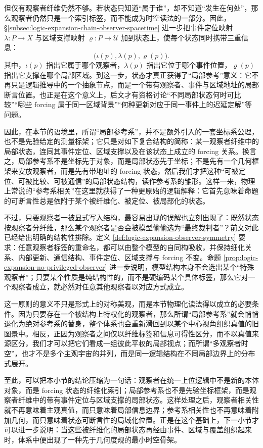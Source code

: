 但仅有观察者纤维仍然不够。若状态只知道“属于谁”，却不知道“发生在何处”，那么观察者仍然只是一个索引标签，而不能成为时空读法的一部分。因此，\S\ref{subsec:logic-expansion-chain-observer-spacetime} 进一步把事件定位映射 \(\lambda:P\to X\) 与区域支撑映射 \(\varrho:P\to\mathcal U\) 加到状态上，使每个状态同时携带三重信息：
\[
\bigl(\iota(p),\lambda(p),\varrho(p)\bigr).
\]
其中，\(\iota(p)\) 指出它属于哪个观察者，\(\lambda(p)\) 指出它位于哪个事件位置，\(\varrho(p)\) 指出它支撑在哪个局部区域。到这一步，状态才真正获得了“局部参考”意义：它不再只是逻辑推导中的一个抽象节点，而是一个带有观察者、事件与区域地址的局部断言位置。也正是在这个意义上，后文才有资格讨论“不同局部状态何时可比较”“哪些 forcing 属于同一区域背景”“何种更新对应于同一事件上的迟延定解”等问题。

因此，在本节的语境里，所谓“局部参考系”，并不是额外引入的一套坐标系公理，也不是先验给定的测量标架；它只是对如下复合结构的简称：某一观察者纤维中的局部状态，连同其事件定位、区域支撑以及在该状态上成立的 forcing 关系。换言之，局部参考系不是坐标先于对象，而是局部状态先于坐标；不是先有一个几何框架来安放观察者，而是先有带地址的 forcing 状态，然后我们才把这种“可被定位、可被比较、可被通信”的局部状态结构，读作参考系的雏形。这样一来，物理上常说的“参考系相关”在这里就获得了一种更原始的逻辑解释：它首先意味着命题的可断言性总是依附于某个被纤维化、被定位、被局部化的状态。

不过，只要观察者一被显式写入结构，最容易出现的误解也立刻出现了：既然状态按观察者分纤维，那么某个观察者是否会被模型偷偷选为“最终裁判者”？前文对此已经给出明确的结构性排除。定义 \ref{def:logic-expansion-observer-symmetry} 要求：任意观察者标签的重命名，都可以由整个模型的自同构吸收，并保持细化关系、内部更新、通信结构、事件定位、区域支撑与 forcing 不变。命题 \ref{prop:logic-expansion-no-privileged-observer} 进一步说明，模型结构本身不会选出某个“特殊观察者”；只要某个性质是纯结构性的，而不是硬编码某个具体标签，那么它对一个观察者成立，就必然对任意其他观察者以对应方式成立。

这一原则的意义不只是形式上的对称美观，而是本节物理化读法得以成立的必要条件。因为只要存在一个被结构上特权化的观察者，那么所谓“局部参考系”就会悄悄退化为绝对参考系的替身，整个体系也会重新滑回到以某个中心视角组织真值的旧图景中。相反，正因为观察者之间仅以纤维标签和信息可得性区分，而不以真值来源区分，我们才可以把它们看成一组彼此平权的局部视点；而所谓“多观察者时空”，也才不是多个主观宇宙的并列，而是同一逻辑结构在不同局部边界上的分布式展开。

至此，可以把本小节的结论压缩为一句话：观察者在统一上位逻辑中不是新的本体对象，而是 forcing 状态的纤维化索引；局部参考系也不是先验坐标框架，而是观察者纤维中的带有事件定位与区域支撑的局部状态。这样处理之后，观察者相关性就不再意味着主观真值，而只意味着局部信息边界；参考系相关性也不再意味着附加几何，而只意味着状态可断言性的局域化位置。正是在这个基础上，下一小节才可以进一步说明：当这些被纤维化的局部状态再经由事件、区域与覆盖组织起来时，体系中便出现了一种先于几何度规的最小时空骨架。
